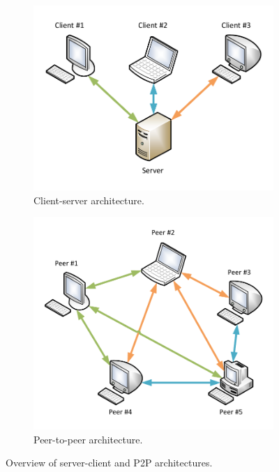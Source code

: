 \begin{figure}
	\centering
	\begin{subfigure}[b]{.5\textwidth}
		\centering
		\includegraphics[width=\textwidth]{diagrams/client-server.pdf}
		\caption{Client-server architecture.}
		\label{fig:intro:arch:client-server}
	\end{subfigure}%
	\begin{subfigure}[b]{.5\textwidth}
		\centering
		\includegraphics[width=\textwidth]{diagrams/p2p.pdf}
		\caption{Peer-to-peer architecture.}
		\label{fig:intro:arch:p2p}
	\end{subfigure}
	\caption[Server-client and P2P architectural overview]{Overview of server-client and \gls{P2P} architectures.}
	\label{fig:intro:arch}
\end{figure}

